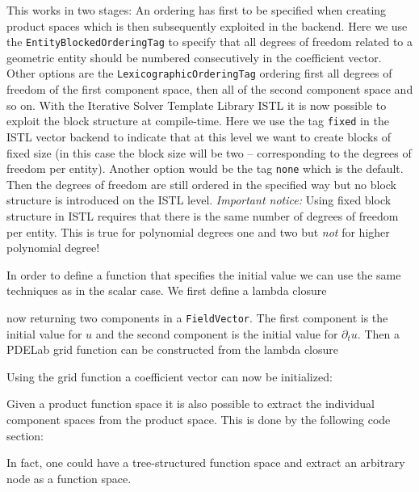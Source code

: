 \documentclass[a4paper,12pt]{article}
\begin{document}
This works in two stages: An ordering has first to be specified when creating product spaces
which is then subsequently exploited in the backend.
Here we use the \lstinline{EntityBlockedOrderingTag} to specify that all degrees of
freedom related to a geometric entity should be numbered consecutively in
the coefficient vector. Other options are the \lstinline{LexicographicOrderingTag}
ordering first all degrees of freedom of the first component space, then
all of the second component space and so on.
With the Iterative Solver Template Library ISTL it is now
possible to exploit the block structure at compile-time.
Here we use the tag \lstinline{fixed} in the ISTL vector backend to indicate
that at this level we want to create blocks of fixed size (in this case the block size will be two --
corresponding to the degrees of freedom per entity). Another option
would be the tag \lstinline{none} which is the default. Then the degrees
of freedom are still ordered in the specified way but no block structure is
introduced on the ISTL level. \textit{Important notice:} Using fixed block
structure in ISTL requires that there is the same number of degrees of freedom
per entity. This is true for polynomial degrees one and two but \textit{not}
for higher polynomial degree!

In order to define a function that specifies the initial value we can
use the same techniques as in the scalar case. We first define a lambda
closure

now returning two components in a \lstinline{FieldVector}.
The first component is the initial value for $u$ and the second component
is the initial value for $\partial_t u$. Then a PDELab grid function
can be constructed from the lambda closure


Using the grid function a coefficient vector can now be initialized:


Given a product function space it is also possible to
extract the individual component spaces from the product
space. This is done by the following code section:

In fact, one could have a tree-structured function space and
extract an arbitrary node as a function space.
\end{document}
